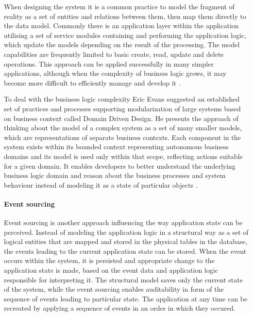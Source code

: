 When designing the system it is a common practice to model the fragment of reality as a set of entities and relations between them, then map them directly to the data model. Commonly there is an application layer within the application utilising a set of service modules containing and performing the application logic, which update the models depending on the result of the processing. The model capabilities are frequently limited to basic create, read, update and delete operations. This approach can be applied successfully in many simpler applications, although when the complexity of business logic grows, it may become more difficult to efficiently manage and develop it \cite{FowlerAnemicModel}.

To deal with the business logic complexity Eric Evans suggested an established set of practices and processes supporting modularization of large systems based on business context called Domain Driven Design. He presents the approach of thinking about the model of a complex system as a set of many smaller models, which are representations of separate business contexts. Each component in the system exists within its bounded context representing autonomous business domains and its model is used only within that scope, reflecting actions suitable for a given domain. It enables developers to better understand the underlying business logic domain and reason about the business processes and system behaviour instead of modeling it as a state of particular objects \cite{EvansDDD}.

\paragraph{Event sourcing}

Event sourcing is another approach influencing the way application state can be perceived. Instead of modeling the application logic in a structural way as a set of logical entities that are mapped and stored in the physical tables in the database, the events leading to the current application state can be stored. When the event occurs within the system, it is persisted and appropriate change to the application state is made, based on the event data and application logic responsible for interpreting it. The structural model saves only the current state of the system, while the event sourcing enables auditability in form of the sequence of events leading to particular state. The application at any time can be recreated by applying a sequence of events in an order in which they occured.

